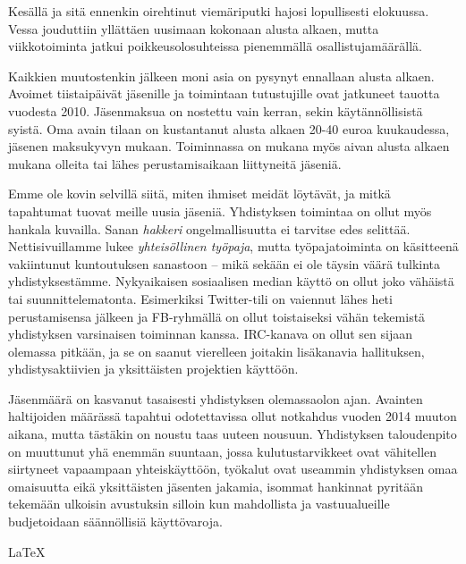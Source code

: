 \documentclass[a4paper]{memoir}
\begin{document}
Kesällä ja sitä ennenkin oirehtinut viemäriputki hajosi lopullisesti elokuussa. Vessa jouduttiin yllättäen uusimaan kokonaan alusta alkaen, mutta viikkotoiminta jatkui poikkeusolosuhteissa pienemmällä osallistujamäärällä.

Kaikkien muutostenkin jälkeen moni asia on pysynyt ennallaan alusta alkaen. Avoimet tiistaipäivät jäsenille ja toimintaan tutustujille ovat jatkuneet tauotta vuodesta 2010. Jäsenmaksua on nostettu vain kerran, sekin käytännöllisistä syistä. Oma avain tilaan on kustantanut alusta alkaen 20-40 euroa kuukaudessa, jäsenen maksukyvyn mukaan. Toiminnassa on mukana myös aivan alusta alkaen mukana olleita tai lähes perustamisaikaan liittyneitä jäseniä. 

Emme ole kovin selvillä siitä, miten ihmiset meidät löytävät, ja mitkä tapahtumat tuovat meille uusia jäseniä. Yhdistyksen toimintaa on ollut myös hankala kuvailla. Sanan \textit{hakkeri} ongelmallisuutta ei tarvitse edes selittää. Nettisivuillamme lukee \textit{yhteisöllinen työpaja}, mutta työpajatoiminta on käsitteenä vakiintunut kuntoutuksen sanastoon -- mikä sekään ei ole täysin väärä tulkinta yhdistyksestämme. Nykyaikaisen sosiaalisen median käyttö on ollut joko vähäistä tai suunnittelematonta. Esimerkiksi Twitter-tili on vaiennut lähes heti perustamisensa jälkeen ja FB-ryhmällä on ollut toistaiseksi vähän tekemistä yhdistyksen varsinaisen toiminnan kanssa. IRC-kanava on ollut sen sijaan olemassa pitkään, ja se on saanut vierelleen joitakin lisäkanavia hallituksen, yhdistysaktiivien ja yksittäisten projektien käyttöön.

Jäsenmäärä on kasvanut tasaisesti yhdistyksen olemassaolon ajan. Avainten haltijoiden määrässä tapahtui odotettavissa ollut notkahdus vuoden 2014 muuton aikana, mutta tästäkin on noustu taas uuteen nousuun. Yhdistyksen taloudenpito on muuttunut yhä enemmän suuntaan, jossa kulutustarvikkeet ovat vähitellen siirtyneet vapaampaan yhteiskäyttöön, työkalut ovat useammin yhdistyksen omaa omaisuutta eikä yksittäisten jäsenten jakamia, isommat hankinnat pyritään tekemään ulkoisin avustuksin silloin kun mahdollista ja vastuualueille budjetoidaan säännöllisiä käyttövaroja.

\vfill

\LaTeX
 
\end{document}
